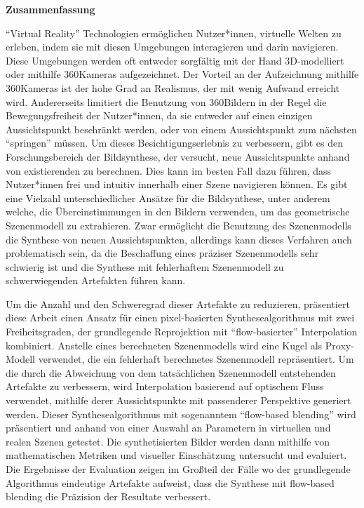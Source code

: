 \vspace*{2cm}

\begin{center}
    \textbf{Zusammenfassung}
\end{center}

\vspace*{1cm}

\noindent 
``Virtual Reality'' Technologien ermöglichen Nutzer*innen, virtuelle Welten zu erleben, indem sie mit diesen Umgebungen interagieren und darin navigieren. Diese Umgebungen werden oft entweder sorgf\"altig mit der Hand 3D-modelliert oder mithilfe 360\degree Kameras aufgezeichnet.
Der Vorteil an der Aufzeichnung mithilfe 360\degree Kameras ist der hohe Grad an Realismus, der mit wenig Aufwand erreicht wird. Andererseits limitiert die Benutzung von 360\degree Bildern in der Regel die Bewegungsfreiheit der Nutzer*innen, da sie entweder auf einen einzigen Aussichtspunkt beschr\"ankt werden, oder von einem Aussichtspunkt zum n\"achsten ``springen'' müssen.
Um dieses Besichtigungserlebnis zu verbessern, gibt es den Forschungsbereich der Bildsynthese, der versucht, neue Aussichtspunkte anhand von existierenden zu berechnen. Dies kann im besten Fall dazu f\"uhren, dass Nutzer*innen frei und intuitiv innerhalb einer Szene navigieren k\"onnen.
Es gibt eine Vielzahl unterschiedlicher Ans\"atze f\"ur die Bildsynthese, unter anderem welche, die \"Ubereinstimmungen in den Bildern verwenden, um das geometrische Szenenmodell zu extrahieren. Zwar erm\"oglicht die Benutzung des Szenenmodells die Synthese von neuen Aussichtspunkten, allerdings kann dieses Verfahren auch problematisch sein, da die Beschaffung eines pr\"aziser Szenenmodells sehr schwierig ist und die Synthese mit fehlerhaftem Szenenmodell zu schwerwiegenden Artefakten f\"uhren kann.

Um die Anzahl und den Schweregrad dieser Artefakte zu reduzieren, pr\"asentiert diese Arbeit einen Ansatz f\"ur einen pixel-basierten Synthesealgorithmus mit zwei Freiheitsgraden, der grundlegende Reprojektion mit ``flow-basierter'' Interpolation kombiniert. Anstelle eines berechneten Szenenmodells wird eine Kugel als Proxy-Modell verwendet, die ein fehlerhaft berechnetes Szenenmodell repr\"asentiert. Um die durch die Abweichung von dem tats\"achlichen Szenenmodell entstehenden Artefakte zu verbessern, wird Interpolation basierend auf optischem Fluss verwendet, mithilfe derer Aussichtspunkte mit passenderer Perspektive generiert werden. Dieser Synthesealgorithmus mit sogenanntem ``flow-based blending'' wird pr\"asentiert und anhand von einer Auswahl an Parametern in virtuellen und realen Szenen getestet. Die synthetisierten Bilder werden dann mithilfe von mathematischen Metriken und visueller Einsch\"atzung untersucht und evaluiert. Die Ergebnisse der Evaluation zeigen im Gro{\ss}teil der F\"alle wo der grundlegende Algorithmus eindeutige Artefakte aufweist, dass die Synthese mit flow-based blending die Pr\"azision der Resultate verbessert.

